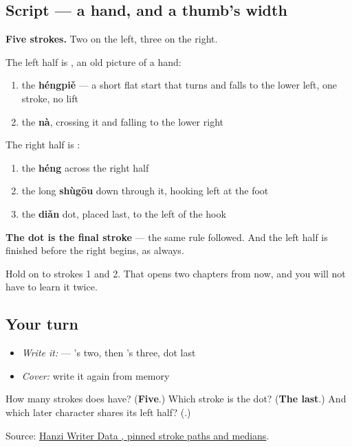 \subsection*{Script — a hand, and a thumb's width}

\begin{quote}
\end{quote}

\textbf{Five strokes.} Two on the left, three on the right.

The left half is , an old picture of a hand:

\begin{enumerate}
\raggedright
  \item the \textbf{héngpiě} — a short flat start that turns and falls to the lower left, one stroke, no lift
  \item the \textbf{nà}, crossing it and falling to the lower right
\end{enumerate}

The right half is :

\begin{enumerate}
\raggedright
  \item the \textbf{héng} across the right half
  \item the long \textbf{shùgōu} down through it, hooking left at the foot
  \item the \textbf{diǎn} dot, placed last, to the left of the hook
\end{enumerate}

\textbf{The dot is the final stroke} — the same rule  followed. And the left half is finished before the right begins, as always.

Hold on to strokes 1 and 2. That  opens \textbf{} two chapters from now, and you will not have to learn it twice.

\subsection*{Your turn}
\begin{itemize}
\raggedright
  \item \emph{Write it:}  — 's two, then 's three, dot last
  \item \emph{Cover:} write it again from memory
\end{itemize}

\begin{tcolorbox}[breakable,colback=teal!4,colframe=teal!35!black,title={Before you move on}]
How many strokes does  have? (\textbf{Five}.) Which stroke is the dot? (\textbf{The last}.) And which later character shares its left half? (\textbf{}.)

Source: \href{https://raw.githubusercontent.com/chanind/hanzi-writer-data/68d10a4b21150cae5e1ebbd223eed289cf32d90c/data/\%E5\%AF\%B9.json}{Hanzi Writer Data , pinned stroke paths and medians}.
\end{tcolorbox}
